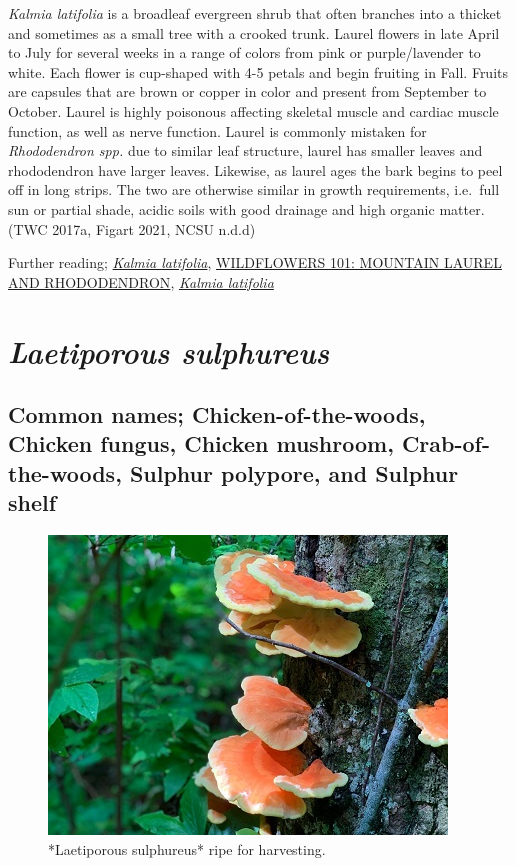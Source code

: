 \documentclass[
]{article}
\begin{document}
\emph{Kalmia latifolia} is a broadleaf evergreen shrub that often branches into a thicket and sometimes as a small tree with a crooked trunk. Laurel flowers in late April to July for several weeks in a range of colors from pink or purple/lavender to white. Each flower is cup-shaped with 4-5 petals and begin fruiting in Fall. Fruits are capsules that are brown or copper in color and present from September to October. Laurel is highly poisonous affecting skeletal muscle and cardiac muscle function, as well as nerve function. Laurel is commonly mistaken for \emph{Rhododendron spp.} due to similar leaf structure, laurel has smaller leaves and rhododendron have larger leaves. Likewise, as laurel ages the bark begins to peel off in long strips. The two are otherwise similar in growth requirements, i.e.~full sun or partial shade, acidic soils with good drainage and high organic matter. (TWC 2017a, Figart 2021, NCSU n.d.d)

Further reading; \href{https://www.wildflower.org/plants/result.php?id_plant=KALA}{\emph{Kalmia latifolia}}, \href{https://www.smokiesinformation.org/news/wildflowers-101-mountain-laurel-and-rhododendron.html\#:~:text=The\%20laurel\%20has\%20the\%20smaller,leaves\%20droop\%20and\%20curl\%20back.}{WILDFLOWERS 101: MOUNTAIN LAUREL AND RHODODENDRON}, \href{https://plants.ces.ncsu.edu/plants/kalmia-latifolia/}{\emph{Kalmia latifolia}}

\hypertarget{laetiporous-sulphureus}{%
\section{\texorpdfstring{\emph{Laetiporous sulphureus}}{Laetiporous sulphureus}}\label{laetiporous-sulphureus}}

\hypertarget{common-names-chicken-of-the-woods-chicken-fungus-chicken-mushroom-crab-of-the-woods-sulphur-polypore-and-sulphur-shelf}{%
\subsection{Common names; Chicken-of-the-woods, Chicken fungus, Chicken mushroom, Crab-of-the-woods, Sulphur polypore, and Sulphur shelf}\label{common-names-chicken-of-the-woods-chicken-fungus-chicken-mushroom-crab-of-the-woods-sulphur-polypore-and-sulphur-shelf}}

\begin{figure}

{\centering \includegraphics[width=0.5\linewidth]{chicken} 

}

\caption{*Laetiporous sulphureus* ripe for harvesting.}\label{fig:chicken}
\end{figure}
\end{document}
